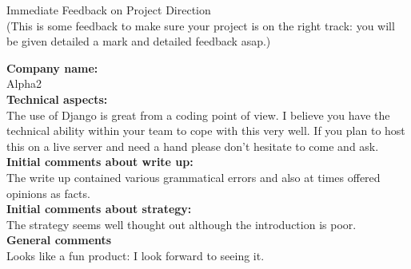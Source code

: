\documentclass{article}
\begin{document}
\begin{center}
\Huge{Immediate Feedback on Project Direction}\\
\tiny{(This is some feedback to make sure your project is on the right track: you will be given detailed a mark and detailed feedback asap.)}
\end{center}


\normalsize
\textbf{Company name:}\\

Alpha2 \\

\textbf{Technical aspects:}\\

The use of Django is great from a coding point of view.
I believe you have the technical ability within your team to cope with this very well.
If you plan to host this on a live server and need a hand please don't hesitate to come and ask. \\

\textbf{Initial comments about write up:}\\

The write up contained various grammatical errors and also at times offered opinions as facts. \\

\textbf{Initial comments about strategy:}\\

The strategy seems well thought out although the introduction is poor. \\

\textbf{General comments}\\

Looks like a fun product: I look forward to seeing it.
\end{document}
